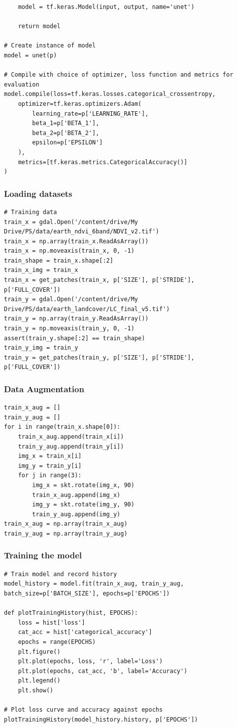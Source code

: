 \documentclass[12pt, a4paper]{report}
\begin{document}
\begin{verbatim}
    model = tf.keras.Model(input, output, name='unet')

    return model

# Create instance of model
model = unet(p)

# Compile with choice of optimizer, loss function and metrics for evaluation
model.compile(loss=tf.keras.losses.categorical_crossentropy,
	optimizer=tf.keras.optimizers.Adam(
		learning_rate=p['LEARNING_RATE'], 
		beta_1=p['BETA_1'], 
		beta_2=p['BETA_2'], 
		epsilon=p['EPSILON']
	),
	metrics=[tf.keras.metrics.CategoricalAccuracy()]
)
\end{verbatim}

\subsubsection*{Loading datasets}
\begin{verbatim}
# Training data
train_x = gdal.Open('/content/drive/My Drive/PS/data/earth_ndvi_6band/NDVI_v2.tif')
train_x = np.array(train_x.ReadAsArray())
train_x = np.moveaxis(train_x, 0, -1)
train_shape = train_x.shape[:2]
train_x_img = train_x
train_x = get_patches(train_x, p['SIZE'], p['STRIDE'], p['FULL_COVER'])
train_y = gdal.Open('/content/drive/My Drive/PS/data/earth_landcover/LC_final_v5.tif')
train_y = np.array(train_y.ReadAsArray())
train_y = np.moveaxis(train_y, 0, -1)
assert(train_y.shape[:2] == train_shape)
train_y_img = train_y
train_y = get_patches(train_y, p['SIZE'], p['STRIDE'], p['FULL_COVER'])
\end{verbatim}
\subsubsection*{Data Augmentation}
\begin{verbatim}
train_x_aug = []
train_y_aug = []
for i in range(train_x.shape[0]):
    train_x_aug.append(train_x[i])
    train_y_aug.append(train_y[i])
    img_x = train_x[i]
    img_y = train_y[i]
    for j in range(3):
        img_x = skt.rotate(img_x, 90)
        train_x_aug.append(img_x)
        img_y = skt.rotate(img_y, 90)
        train_y_aug.append(img_y)
train_x_aug = np.array(train_x_aug)
train_y_aug = np.array(train_y_aug)
\end{verbatim}
\subsubsection*{Training the model}
\begin{verbatim}
# Train model and record history
model_history = model.fit(train_x_aug, train_y_aug, batch_size=p['BATCH_SIZE'], epochs=p['EPOCHS'])

def plotTrainingHistory(hist, EPOCHS):
    loss = hist['loss']
    cat_acc = hist['categorical_accuracy']
    epochs = range(EPOCHS)
    plt.figure()
    plt.plot(epochs, loss, 'r', label='Loss')
    plt.plot(epochs, cat_acc, 'b', label='Accuracy')
    plt.legend()
    plt.show()

# Plot loss curve and accuracy against epochs
plotTrainingHistory(model_history.history, p['EPOCHS'])
\end{verbatim}
\end{document}
